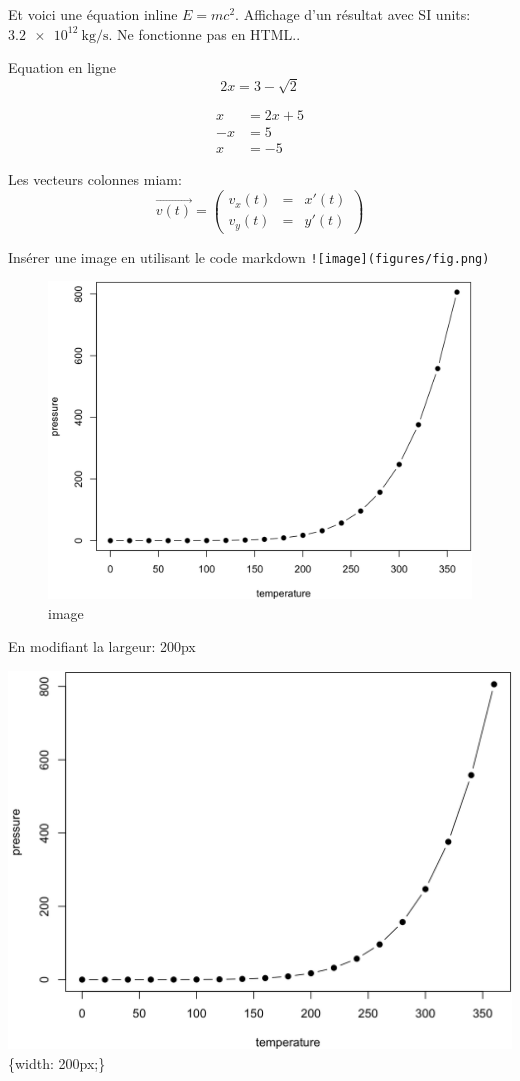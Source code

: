 \documentclass[
]{book}
\begin{document}
Et voici une équation inline \(E=mc^2\). Affichage d'un résultat avec SI units: \(\SI{3.2e12}{\kilo\gram\per\second}\). Ne fonctionne pas en HTML..

Equation en ligne \[2x  = 3 -\sqrt{2}\]

\begin{align}
x &= 2x +5 \\
-x &= 5 \\
x &= -5 
\end{align}

Les vecteurs colonnes miam:
\[\overrightarrow{v(t)} = \begin{pmatrix}v_x(t) &=& x'(t)\\
v_y(t) &=& y'(t)
\end{pmatrix}\]

Insérer une image en utilisant le code markdown
\texttt{!{[}image{]}(figures/fig.png)}

\begin{figure}
\centering
\includegraphics{figures/fig.png}
\caption{image}
\end{figure}

En modifiant la largeur: 200px

\includegraphics{figures/fig.png}\{width: 200px;\}
\end{document}

